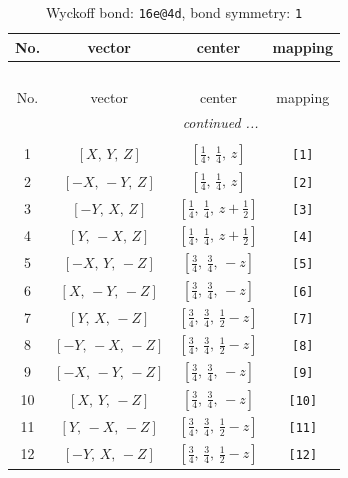 \documentclass[fleqn,8pt]{jsarticle}
\begin{document}
\begin{longtable}{cccc}
\caption{Wyckoff bond: {\tt 16e@4d}, bond symmetry: {\tt 1}}
 \\
 \hline \hline
No. & vector & center & mapping \\ \hline \endfirsthead

\multicolumn{3}{l}{\tablename\ \thetable{}} \\
 \hline \hline
No. & vector & center & mapping \\ \hline \endhead

 \hline \hline
\multicolumn{3}{r}{\footnotesize\it continued ...} \\ \endfoot

 \hline \hline
\multicolumn{3}{r}{} \\ \endlastfoot

1 & $\left[ X,\, Y,\, Z \right]$ & $\left[ \frac{1}{4},\, \frac{1}{4},\, z \right]$ & {\tt [1]} \\ \hline
2 & $\left[ - X,\, - Y,\, Z \right]$ & $\left[ \frac{1}{4},\, \frac{1}{4},\, z \right]$ & {\tt [2]} \\ \hline
3 & $\left[ - Y,\, X,\, Z \right]$ & $\left[ \frac{1}{4},\, \frac{1}{4},\, z + \frac{1}{2} \right]$ & {\tt [3]} \\ \hline
4 & $\left[ Y,\, - X,\, Z \right]$ & $\left[ \frac{1}{4},\, \frac{1}{4},\, z + \frac{1}{2} \right]$ & {\tt [4]} \\ \hline
5 & $\left[ - X,\, Y,\, - Z \right]$ & $\left[ \frac{3}{4},\, \frac{3}{4},\, - z \right]$ & {\tt [5]} \\ \hline
6 & $\left[ X,\, - Y,\, - Z \right]$ & $\left[ \frac{3}{4},\, \frac{3}{4},\, - z \right]$ & {\tt [6]} \\ \hline
7 & $\left[ Y,\, X,\, - Z \right]$ & $\left[ \frac{3}{4},\, \frac{3}{4},\, \frac{1}{2} - z \right]$ & {\tt [7]} \\ \hline
8 & $\left[ - Y,\, - X,\, - Z \right]$ & $\left[ \frac{3}{4},\, \frac{3}{4},\, \frac{1}{2} - z \right]$ & {\tt [8]} \\ \hline
9 & $\left[ - X,\, - Y,\, - Z \right]$ & $\left[ \frac{3}{4},\, \frac{3}{4},\, - z \right]$ & {\tt [9]} \\ \hline
10 & $\left[ X,\, Y,\, - Z \right]$ & $\left[ \frac{3}{4},\, \frac{3}{4},\, - z \right]$ & {\tt [10]} \\ \hline
11 & $\left[ Y,\, - X,\, - Z \right]$ & $\left[ \frac{3}{4},\, \frac{3}{4},\, \frac{1}{2} - z \right]$ & {\tt [11]} \\ \hline
12 & $\left[ - Y,\, X,\, - Z \right]$ & $\left[ \frac{3}{4},\, \frac{3}{4},\, \frac{1}{2} - z \right]$ & {\tt [12]} \\ \hline

\end{longtable}
\end{document}
